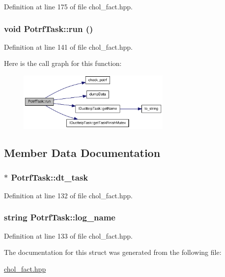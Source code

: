 Definition at line 175 of file chol\_\-fact.hpp.\hypertarget{struct_potrf_task_a03b693541e273a0980b61307638f6728}{
\subsubsection[{run}]{\setlength{\rightskip}{0pt plus 5cm}void PotrfTask::run ()}}
\label{struct_potrf_task_a03b693541e273a0980b61307638f6728}


Definition at line 141 of file chol\_\-fact.hpp.

Here is the call graph for this function:\nopagebreak
\begin{figure}[H]
\begin{center}
\leavevmode
\includegraphics[width=212pt]{struct_potrf_task_a03b693541e273a0980b61307638f6728_cgraph}
\end{center}
\end{figure}


\subsection{Member Data Documentation}
\hypertarget{struct_potrf_task_a65ff75f51dd2d75b0954dd9e4f1ad807}{
\subsubsection[{dt\_\-task}]{$\ast$ {\bf PotrfTask::dt\_\-task}}}
\label{struct_potrf_task_a65ff75f51dd2d75b0954dd9e4f1ad807}


Definition at line 132 of file chol\_\-fact.hpp.\hypertarget{struct_potrf_task_abbf9bea396bbc54ba1fcc951d63b5a09}{
\subsubsection[{log\_\-name}]{\setlength{\rightskip}{0pt plus 5cm}string {\bf PotrfTask::log\_\-name}}}
\label{struct_potrf_task_abbf9bea396bbc54ba1fcc951d63b5a09}


Definition at line 133 of file chol\_\-fact.hpp.

The documentation for this struct was generated from the following file:\begin{DoxyCompactItemize}
\item 
\hyperlink{chol__fact_8hpp}{chol\_\-fact.hpp}\end{DoxyCompactItemize}
